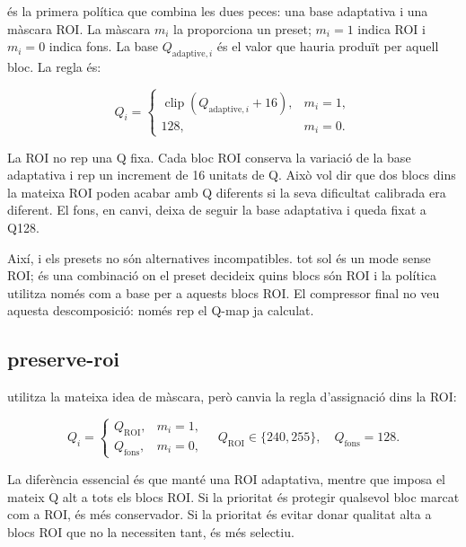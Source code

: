 és la primera política que combina les dues peces: una base
adaptativa i una màscara ROI. La màscara $m_i$ la proporciona un preset; $m_i=1$
indica ROI i $m_i=0$ indica fons. La base $Q_{\mathrm{adaptive},i}$ és el valor
que hauria produït  per aquell bloc. La regla és:

\begin{equation}
Q_i=
\begin{cases}
  \operatorname{clip}(Q_{\mathrm{adaptive},i}+16),&m_i=1,\\
128,&m_i=0.
\end{cases}
\label{eq:focus}
\end{equation}

La ROI no rep una Q fixa. Cada bloc ROI conserva la variació de la base
adaptativa i rep un increment de 16 unitats de Q. Això vol dir que dos blocs dins
la mateixa ROI poden acabar amb Q diferents si la seva dificultat calibrada era
diferent. El fons, en canvi, deixa de seguir la base adaptativa i queda fixat a
Q128.

Així,  i els presets no són alternatives incompatibles.
 tot sol és un mode sense ROI; 
és una combinació on el preset decideix quins blocs són ROI i la política
 utilitza  només com a base per a aquests
blocs ROI. El compressor final no veu aquesta descomposició: només rep el Q-map
ja calculat.

\subsection{preserve-roi}

 utilitza la mateixa idea de màscara, però canvia la regla
d'assignació dins la ROI:

\begin{equation}
Q_i=
\begin{cases}
Q_{\mathrm{ROI}},&m_i=1,\\
Q_{\mathrm{fons}},&m_i=0,
\end{cases}
\quad
Q_{\mathrm{ROI}}\in\{240,255\},\quad Q_{\mathrm{fons}}=128.
\label{eq:preserve}
\end{equation}

La diferència essencial és que  manté una ROI adaptativa,
mentre que  imposa el mateix Q alt a tots els blocs ROI. Si
la prioritat és protegir qualsevol bloc marcat com a ROI, 
és més conservador. Si la prioritat és evitar donar qualitat alta a blocs ROI
que no la necessiten tant,  és més selectiu.

